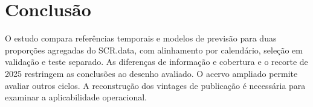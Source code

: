 \documentclass[12pt]{article}
\begin{document}
\section{Conclusão}
O estudo compara referências temporais e modelos de previsão para duas
proporções agregadas do SCR.data, com alinhamento por calendário, seleção em
validação e teste separado. As diferenças de informação e cobertura e o
recorte de 2025 restringem as conclusões ao desenho avaliado. O acervo
ampliado permite avaliar outros ciclos. A reconstrução dos vintages de
publicação é necessária para examinar a aplicabilidade operacional.


\end{document}
